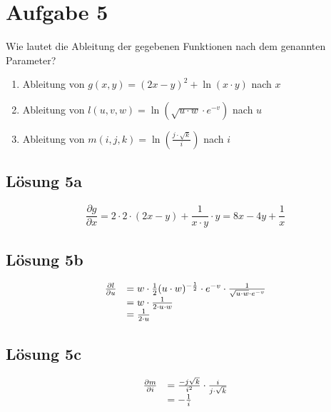 \documentclass[main.tex]{subfiles}
\begin{document}
\section{Aufgabe 5}
Wie lautet die Ableitung der gegebenen Funktionen nach dem genannten Parameter?

\begin{enumerate}
    \item Ableitung von $g( x,y) =( 2x-y)^{2} +\ln( x\cdotp y)$ nach $x$
    \item Ableitung von $l( u,v,w) =\ln\left(\sqrt{u\cdotp w} \cdotp e^{-v}\right)$ nach $u$
    \item Ableitung von $m( i,j,k) =\ln\left(\frac{j\cdotp \sqrt{k}}{i}\right)$ nach $i$
\end{enumerate}

\subsection{Lösung 5a}
$$
    \frac{\partial g}{\partial x} = 2\cdot 2\cdot (2x -y) + \frac{1}{x\cdot y} \cdot y = 8x -4y +\frac{1}{x}
$$

\subsection{Lösung 5b}
$$
    \begin{array}{ c l }
    \frac{\partial l}{\partial u} & =w\cdotp \frac{1}{2}( u\cdotp w)^{-\frac{1}{2}} \cdotp e^{-v} \cdotp \frac{1}{\sqrt{u\cdotp w} \cdotp e^{-v}}\\
     & =w\cdotp \frac{1}{2\cdotp u\cdotp w}\\
     & =\frac{1}{2\cdotp u}
    \end{array}
$$

\subsection{Lösung 5c}
$$
    \begin{array}{ c l }
    \frac{\partial m}{\partial i} & =\frac{-j\sqrt{k}}{i^{2}} \cdotp \frac{i}{j\cdotp \sqrt{k}}\\
     & =-\frac{1}{i}
    \end{array}
$$
\end{document}
